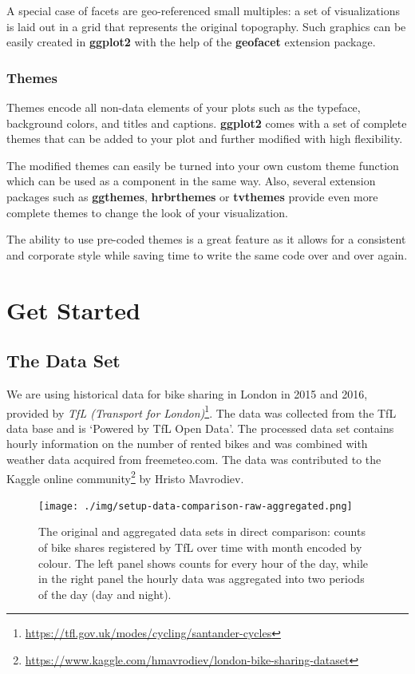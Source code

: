 \documentclass[
]{krantz}
\renewcommand{\href}[2]{#2\footnote{\url{#1}}}
\begin{document}
A special case of facets are geo-referenced small multiples: a set of visualizations is laid out in a grid that represents the original topography. Such graphics can be easily created in \textbf{ggplot2} with the help of the \textbf{geofacet} extension package.

\hypertarget{themes}{%
\subsection{Themes}\label{themes}}

Themes encode all non-data elements of your plots such as the typeface, background colors, and titles and captions. \textbf{ggplot2} comes with a set of complete themes that can be added to your plot and further modified with high flexibility.

The modified themes can easily be turned into your own custom theme function which can be used as a component in the same way. Also, several extension packages such as \textbf{ggthemes}, \textbf{hrbrthemes} or \textbf{tvthemes} provide even more complete themes to change the look of your visualization.

The ability to use pre-coded themes is a great feature as it allows for a consistent and corporate style while saving time to write the same code over and over again.

\hypertarget{get-started}{%
\chapter{Get Started}\label{get-started}}

\hypertarget{dataset}{%
\section{The Data Set}\label{dataset}}

We are using historical data for bike sharing in London in 2015 and 2016, provided by \href{https://tfl.gov.uk/modes/cycling/santander-cycles}{\emph{TfL (Transport for London)}}. The data was collected from the TfL data base and is `Powered by TfL Open Data'. The processed data set contains hourly information on the number of rented bikes and was combined with weather data acquired from freemeteo.com. The data was contributed to the \href{https://www.kaggle.com/hmavrodiev/london-bike-sharing-dataset}{Kaggle online community} by Hristo Mavrodiev.

\begin{figure}
\centering
\texttt{[image: ./img/setup-data-comparison-raw-aggregated.png]}
\caption{\label{fig:03imgDataComparison}The original and aggregated data sets in direct comparison: counts of bike shares registered by TfL over time with month encoded by colour. The left panel shows counts for every hour of the day, while in the right panel the hourly data was aggregated into two periods of the day (day and night).}
\end{figure}
\end{document}
